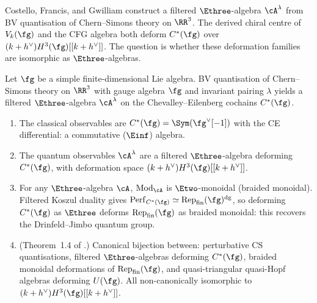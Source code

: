 Costello, Francis, and Gwilliam construct a filtered
$\Ethree$-algebra $\cA^\lambda$ from BV quantisation of
Chern--Simons theory on $\RR^3$. The derived chiral centre
of $V_k(\fg)$ and the CFG algebra both deform $C^*(\fg)$
over $(k+h^\vee) H^3(\fg)[[k+h^\vee]]$. The question is whether
these deformation families are isomorphic as
$\Ethree$-algebras.

\begin{theorem}
\label{thm:cfg}
Let $\fg$ be a simple finite-dimensional Lie algebra.
BV quantisation of Chern--Simons theory on $\RR^3$ with
gauge algebra $\fg$ and invariant pairing $\lambda$ yields
a filtered $\Ethree$-algebra $\cA^\lambda$ on the
Chevalley--Eilenberg cochains $C^*(\fg)$.
\begin{enumerate}[label=\textup{(\roman*)}]
\item The classical observables are
  $C^*(\fg) = \Sym(\fg^\vee[-1])$
  with the CE differential: a commutative
  \textup{(}$\Einf$\textup{)} algebra.
\item The quantum observables
  $\cA^\lambda$ are a filtered $\Ethree$-algebra deforming
  $C^*(\fg)$, with deformation space
  $(k+h^\vee) H^3(\fg)[[k+h^\vee]]$.
\item For any $\Ethree$-algebra $\cA$,
  $\mathrm{Mod}_\cA$ is $\Etwo$-monoidal \textup{(}braided
  monoidal\textup{)}. Filtered Koszul duality gives
  $\mathrm{Perf}_{C^*(\fg)}
  \simeq \mathrm{Rep}_{\mathrm{fin}}(\fg)^{\mathrm{dg}}$,
  so deforming $C^*(\fg)$ as $\Ethree$ deforms
  $\mathrm{Rep}_{\mathrm{fin}}(\fg)$ as braided monoidal:
  this recovers the Drinfeld--Jimbo quantum group.
\item \textup{(Theorem~1.4 of \cite{CFG26}.)} Canonical
  bijection between: perturbative CS quantisations, filtered
  $\Ethree$-algebras deforming $C^*(\fg)$, braided monoidal
  deformations of $\mathrm{Rep}_{\mathrm{fin}}(\fg)$, and
  quasi-triangular quasi-Hopf algebras deforming $U(\fg)$.
  All non-canonically isomorphic to
  $(k+h^\vee) H^3(\fg)[[k+h^\vee]]$.
\end{enumerate}
\end{theorem}

